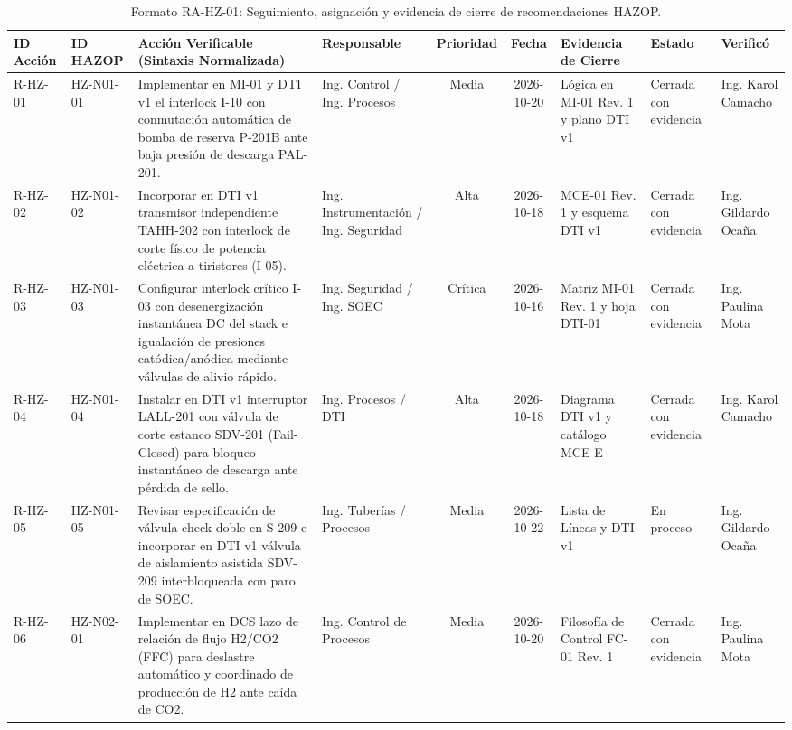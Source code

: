 \documentclass[10pt,letterpaper]{article}
\begin{document}
\begin{table}[H]
\centering\footnotesize
\caption{Formato RA-HZ-01: Seguimiento, asignación y evidencia de cierre de recomendaciones HAZOP.} \label{tab:rahz_tabla}
\begin{tabularx}{\textwidth}{|l|l|X|p{2.6cm}|c|c|p{2.6cm}|p{1.8cm}|p{2.2cm}|}
\hline
\rowcolor{tableheader}\color{white}\textbf{ID Acción} & \color{white}\textbf{ID HAZOP} & \color{white}\textbf{Acción Verificable (Sintaxis Normalizada)} & \color{white}\textbf{Responsable} & \color{white}\textbf{Prioridad} & \color{white}\textbf{Fecha} & \color{white}\textbf{Evidencia de Cierre} & \color{white}\textbf{Estado} & \color{white}\textbf{Verificó} \\ \hline
R-HZ-01 & HZ-N01-01 & Implementar en MI-01 y DTI v1 el interlock I-10 con conmutación automática de bomba de reserva P-201B ante baja presión de descarga PAL-201. & Ing. Control / Ing. Procesos & Media & 2026-10-20 & Lógica en MI-01 Rev. 1 y plano DTI v1 & Cerrada con evidencia & Ing. Karol Camacho \\ \hline
R-HZ-02 & HZ-N01-02 & Incorporar en DTI v1 transmisor independiente TAHH-202 con interlock de corte físico de potencia eléctrica a tiristores (I-05). & Ing. Instrumentación / Ing. Seguridad & Alta & 2026-10-18 & MCE-01 Rev. 1 y esquema DTI v1 & Cerrada con evidencia & Ing. Gildardo Ocaña \\ \hline
R-HZ-03 & HZ-N01-03 & Configurar interlock crítico I-03 con desenergización instantánea DC del stack e igualación de presiones catódica/anódica mediante válvulas de alivio rápido. & Ing. Seguridad / Ing. SOEC & Crítica & 2026-10-16 & Matriz MI-01 Rev. 1 y hoja DTI-01 & Cerrada con evidencia & Ing. Paulina Mota \\ \hline
R-HZ-04 & HZ-N01-04 & Instalar en DTI v1 interruptor LALL-201 con válvula de corte estanco SDV-201 (Fail-Closed) para bloqueo instantáneo de descarga ante pérdida de sello. & Ing. Procesos / DTI & Alta & 2026-10-18 & Diagrama DTI v1 y catálogo MCE-E & Cerrada con evidencia & Ing. Karol Camacho \\ \hline
R-HZ-05 & HZ-N01-05 & Revisar especificación de válvula check doble en S-209 e incorporar en DTI v1 válvula de aislamiento asistida SDV-209 interbloqueada con paro de SOEC. & Ing. Tuberías / Procesos & Media & 2026-10-22 & Lista de Líneas y DTI v1 & En proceso & Ing. Gildardo Ocaña \\ \hline
R-HZ-06 & HZ-N02-01 & Implementar en DCS lazo de relación de flujo H2/CO2 (FFC) para deslastre automático y coordinado de producción de H2 ante caída de CO2. & Ing. Control de Procesos & Media & 2026-10-20 & Filosofía de Control FC-01 Rev. 1 & Cerrada con evidencia & Ing. Paulina Mota \\ \hline

\end{tabularx}
\end{table}
\end{document}
